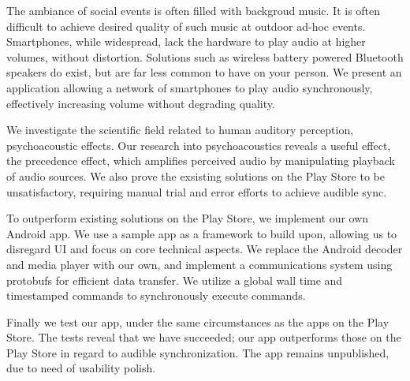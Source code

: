 The ambiance of social events is often filled with backgroud music.
It is often difficult to achieve desired quality of such music at outdoor ad-hoc events.
Smartphones, while widespread, lack the hardware to play audio at higher volumes, without distortion.
Solutions such as wireless battery powered Bluetooth speakers do exist, but are far less common to have on your person.
We present an application allowing a network of smartphones to play audio synchronously, effectively increasing volume without degrading quality.

\bigskip \noindent
We investigate the scientific field related to human auditory perception, psychoacoustic effects.
Our research into psychoacoustics reveals a useful effect, the precedence effect, which amplifies perceived audio by manipulating playback of audio sources.
We also prove the exsisting solutions on the Play Store to be unsatisfactory, requiring manual trial and error efforts to achieve audible sync. 

\bigskip \noindent
To outperform existing solutions on the Play Store, we implement our own Android app.
We use a sample app as a framework to build upon, allowing us to disregard UI and focus on core technical aspects.
We replace the Android decoder and media player with our own, and implement a communications system using protobufs for efficient data transfer.
We utilize a global wall time and timestamped commands to synchronously execute commands.

\bigskip \noindent
Finally we test our app, under the same circumstances as the apps on the Play Store.
The tests reveal that we have succeeded; our app outperforms those on the Play Store in regard to audible synchronization.
The app remains unpublished, due to need of usability polish.
